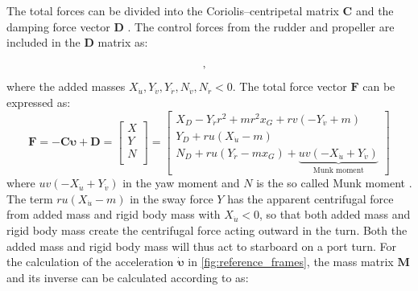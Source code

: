 The total forces can be divided into the Coriolis–centripetal matrix $\mathbf{C}$ and the damping force vector $\mathbf{D}$ \citep{fossenHandbookMarineCraft2011}. The control forces from the rudder and propeller are included in the $\mathbf{D}$ matrix as:
\begin{equation}
    \label{eq:C_expanded}
    , \hspace{0.3cm}
    
\end{equation}
where the added masses $X_{\dot{u}},Y_{\dot{v}},Y_{\dot{r}},N_{\dot{v}},N_{\dot{r}} < 0$. The total force vector $\mathbf{F}$ can be expressed as:
\begin{equation}
    \label{eq:F_expanded}
\mathbf{F} = - \mathbf{C} \pmb{\upsilon} + \mathbf{D} =
\left[\begin{matrix}
X \\
Y \\
N \\
\end{matrix}\right]
=
\left[\begin{matrix}X_{D} - Y_{\dot{r}} r^{2} + m r^{2} x_{G} + r v \left(- Y_{\dot{v}} + m\right)\\Y_{D} + r u \left(X_{\dot{u}} - m\right)\\N_{D} + r u \left(Y_{\dot{r}} - m x_{G}\right) + \underbrace{u v \left(- X_{\dot{u}} + Y_{\dot{v}}\right)}_{\text{Munk moment}} \end{matrix}\right]
\end{equation}
where $u v \left(- X_{\dot{u}} + Y_{\dot{v}}\right)$ in the yaw moment and $N$ is the so called Munk moment \citep{fossenHandbookMarineCraft2011}. The term $r u \left(X_{\dot{u}} - m\right)$ in the sway force $Y$ has the apparent centrifugal force from added mass and rigid body mass with $X_{\dot{u}}<0$, so that both added mass and rigid body mass create the centrifugal force acting outward in the turn. Both the added mass and rigid body mass will thus act to starboard on a port turn.
For the calculation of the acceleration $\pmb{\dot{\upsilon}}$ in \autoref{fig:reference_frames}, the mass matrix $\mathbf{M}$ and its inverse can be calculated according to \citet{fossenHandbookMarineCraft2011} as: 
